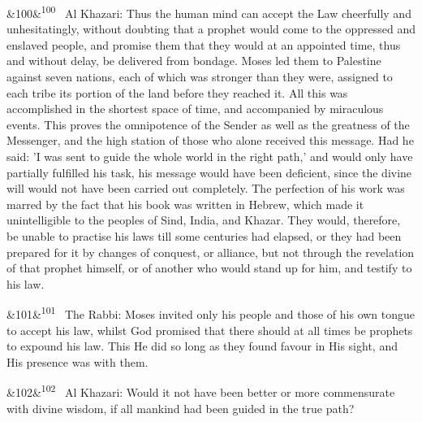\documentclass[12pt]{article}
\newcommand{\para}[1][]{\par\noindent\ifx&#1&\else\textsuperscript{\footnotesize #1}~\fi}
\begin{document}
\para[100] Al Khazari: Thus the human mind can accept the Law cheerfully and unhesitatingly, without doubting that a prophet would come to the oppressed and enslaved people, and promise them that they would at an appointed time, thus and without delay, be delivered from bondage. Moses led them to Palestine against seven nations, each of which was stronger than they were, assigned to each tribe its portion of the land before they reached it. All this was accomplished in the shortest space of time, and accompanied by miraculous events. This proves the omnipotence of the Sender as well as the greatness of the Messenger, and the high station of those who alone received this message. Had he said: 'I was sent to guide the whole world in the right path,' and would only have partially fulfilled his task, his message would have been deficient, since the divine will would not have been carried out completely. The perfection of his work was marred by the fact that his book was written in Hebrew, which made it unintelligible to the peoples of Sind, India, and Khazar. They would, therefore, be unable to practise his laws till some centuries had elapsed, or they had been prepared for it by changes of conquest, or alliance, but not through the revelation of that prophet himself, or of another who would stand up for him, and testify to his law.

\para[101] The Rabbi: Moses invited only his people and those of his own tongue to accept his law, whilst God promised that there should at all times be prophets to expound his law. This He did so long as they found favour in His sight, and His presence was with them.

\para[102] Al Khazari: Would it not have been better or more commensurate with divine wisdom, if all mankind had been guided in the true path?
\end{document}
